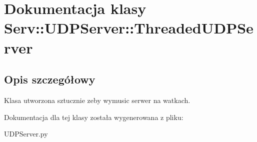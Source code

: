 \hypertarget{class_serv_1_1_u_d_p_server_1_1_threaded_u_d_p_server}{
\section{Dokumentacja klasy Serv::UDPServer::ThreadedUDPServer}
\label{class_serv_1_1_u_d_p_server_1_1_threaded_u_d_p_server}
}


\subsection{Opis szczegółowy}
\begin{DoxyVerb}Klasa utworzona sztucznie zeby wymusic serwer na watkach.\end{DoxyVerb}
 

Dokumentacja dla tej klasy została wygenerowana z pliku:\begin{DoxyCompactItemize}
\item 
UDPServer.py\end{DoxyCompactItemize}
